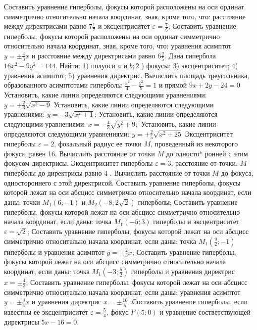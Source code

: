 Составить уравнение гиперболы, фокусы которой расположены на оси ординат симметрично относительно начала координат, зная, кроме того, что: расстояние между директрисами равно $7 \frac{1}{7}$ и эксцентриситет $\varepsilon=\frac{7}{5}$;
Составить уравнение гиперболы, фокусы которой расположены на оси ординат симметрично относительно начала координат, зная, кроме того, что: уравнения асимптот $y= \pm \frac{4}{3} x$ и расстояние между директрисами равно $6 \frac{2}{5}$.
Дана гипербола $16 x^2-9 y^2=144$. Найти: 1) полуоси $a$ и $b ; 2$ ) фокусы; 3) эксцентриситет; 4) уравнения асимптот; 5) уравнения директрис.
Вычислить площадь треугольника, образованного асимптотами гиперболы $\frac{x^2}{4}-\frac{y^2}{9}=1$ и прямой $9 x+2 y-24=0$
Установить, какие линии определяются следующими уравнениями: $y=+\frac{2}{3} \sqrt{x^2-9}$
Установить, какие линии определяются следующими уравнениями: $y=-3 \sqrt{x^2+1}$;
Установить, какие линии определяются следующими уравнениями: $x=-\frac{4}{3} \sqrt{y^2+9} ;$
Установить, какие линии определяются следующими уравнениями: $y=+\frac{2}{5} \sqrt{x^2+25}$
Эксцентриситет гиперболы $\varepsilon=2$, фокальный радиус ее точки $M$, проведенный из некоторого фокуса, равен 16. Вычислить расстояние от точки $M$ до односто* ронней с этим фокусом директрисы.
Эксцентриситет гиперболы $\varepsilon=3$, расстояние от точки. $M$ гиперболы до директрисы равно 4 . Вычислить расстояние от точки $M$ до фокуса, одностороннего с этой директрисой.
Составить уравнение гиперболы, фокусы которой лежат на оси абсцисс симметрично относительно начала координат, если даны: точки $M_1(6 ;-1)$ и $M_2(-8 ; 2 \sqrt{2})$ гиперболы;
Составить уравнение гиперболы, фокусы которой лежат на оси абсцисс симметрично относительно начала координат, если даны: точка $M_1(-5 ; 3)$ гиперболы и эксцентриситет $\varepsilon=\sqrt{2}$;
Составить уравнение гиперболы, фокусы которой лежат на оси абсцисс симметрично относительно начала координат, если даны: точка $M_1\left(\frac{9}{2} ;-1\right)$ гиперболы и уравнения асимптот $y= \pm \frac{2}{3} x$;
Составить уравнение гиперболы, фокусы которой лежат на оси абсцисс симметрично относительно начала координат, если даны: точка $M_1\left(-3 ; \frac{5}{2}\right)$ гиперболы и уравнения директрис $x= \pm \frac{4}{3}$;
Составить уравнение гиперболы, фокусы которой лежат на оси абсцисс симметрично относительно начала координат, если даны: уравнения асимптот $y= \pm \frac{3}{4} x$ и уравнения директрис $x= \pm \frac{16}{5}$.
Составить уравнение гиперболы, если известны ее эксцентриситет $\varepsilon=\frac{5}{4}$, фокус $F(5 ; 0)$ и уравнение состветствующей директрисы $5 x-16=0$.
